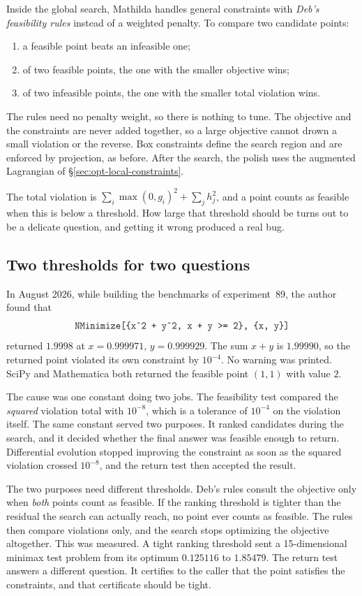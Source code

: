 Inside the global search, Mathilda handles general constraints with
\emph{Deb's feasibility rules} instead of a
weighted penalty. To compare two candidate points:
\begin{enumerate}
\item a feasible point beats an infeasible one;
\item of two feasible points, the one with the smaller objective wins;
\item of two infeasible points, the one with the smaller total violation wins.
\end{enumerate}
The rules need no penalty weight, so there is nothing to tune. The objective
and the constraints are never added together, so a large objective cannot
drown a small violation or the reverse. Box constraints define the search
region and are enforced by projection, as before. After the search, the
polish uses the augmented Lagrangian of \S\ref{sec:opt-local-constraints}.

The total violation is \(\sum_i \max(0, g_i)^2 + \sum_j h_j^2\), and a point
counts as feasible when this is below a threshold. How large that threshold
should be turns out to be a delicate question, and getting it wrong produced
a real bug.

\subsection{Two thresholds for two questions}

In August 2026, while building the benchmarks of experiment~89, the author
found that
\[
  \mcode{NMinimize[\{x\^{}2 + y\^{}2, x + y >= 2\}, \{x, y\}]}
\]
returned \(1.9998\) at \(x = 0.999971\), \(y = 0.999929\). The sum \(x + y\) is
\(1.99990\), so the returned point violated its own constraint by
\(10^{-4}\). No warning was printed. SciPy and Mathematica both returned the
feasible point \((1,1)\) with value \(2\).

The cause was one constant doing two jobs. The feasibility test compared the
\emph{squared} violation total with \(10^{-8}\), which is a tolerance of
\(10^{-4}\) on the violation itself. The same constant served two purposes. It
ranked candidates during the search, and it decided whether the final answer
was feasible enough to return. Differential evolution stopped improving the
constraint as soon as the squared violation crossed \(10^{-8}\), and the
return test then accepted the result.

The two purposes need different thresholds. Deb's rules consult the objective
only when \emph{both} points count as feasible. If the ranking threshold is
tighter than the residual the search can actually reach, no point ever counts
as feasible. The rules then compare violations only, and the search stops
optimizing the objective altogether. This was measured. A tight ranking
threshold sent a 15-dimensional minimax test problem from its optimum
\(0.125116\) to \(1.85479\). The return test answers a different question. It
certifies to the caller that the point satisfies the constraints, and that
certificate should be tight.

